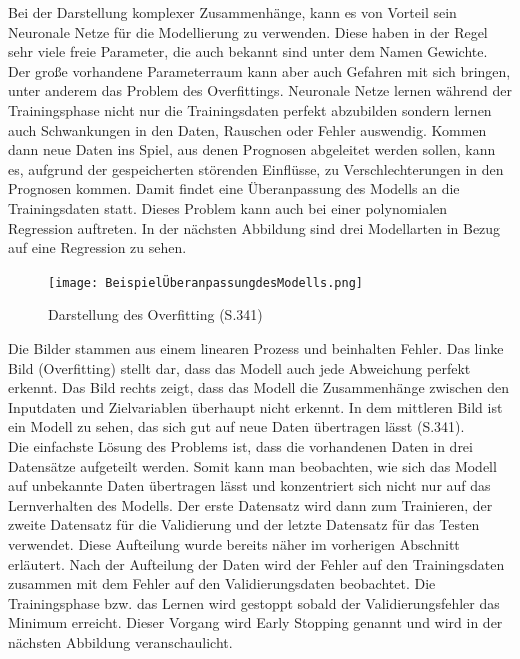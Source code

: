 \documentclass[12pt]{scrreprt}
\begin{document}
Bei der Darstellung komplexer Zusammenhänge, kann es von Vorteil sein Neuronale Netze für die Modellierung zu verwenden. Diese haben in der Regel sehr viele freie Parameter, die auch bekannt sind unter dem Namen Gewichte. Der große vorhandene Parameterraum kann aber auch Gefahren mit sich bringen, unter anderem das Problem des Overfittings. Neuronale Netze lernen während der Trainingsphase nicht nur die Trainingsdaten perfekt abzubilden sondern lernen auch Schwankungen in den Daten, Rauschen oder Fehler auswendig. Kommen dann neue Daten ins Spiel, aus denen Prognosen abgeleitet werden sollen, kann es, aufgrund der gespeicherten störenden Einflüsse, zu Verschlechterungen in den Prognosen kommen. Damit findet eine Überanpassung des Modells an die Trainingsdaten statt. Dieses Problem kann auch bei einer polynomialen Regression auftreten. In der nächsten Abbildung sind drei Modellarten in Bezug auf eine Regression zu sehen.\\

\begin{figure}[h!]
	\centering
	\texttt{[image: BeispielÜberanpassungdesModells.png]}
	\caption{Darstellung des Overfitting \cite{Vogl2021} (S.341)}
	\label{fig:fig22}
\end{figure}

Die Bilder stammen aus einem linearen Prozess und beinhalten Fehler. Das linke Bild (Overfitting) stellt dar, dass das Modell auch jede Abweichung perfekt erkennt. Das Bild rechts zeigt, dass das Modell die Zusammenhänge zwischen den Inputdaten und Zielvariablen überhaupt nicht erkennt. In dem mittleren Bild ist ein Modell zu sehen, das sich gut auf neue Daten übertragen lässt \cite{Vogl2021} (S.341).\\

Die einfachste Lösung des Problems ist, dass die vorhandenen Daten in drei Datensätze aufgeteilt werden. Somit kann man beobachten, wie sich das Modell auf unbekannte Daten übertragen lässt und konzentriert sich nicht nur auf das Lernverhalten des Modells. Der erste Datensatz wird dann zum Trainieren, der zweite Datensatz für die Validierung und der letzte Datensatz für das Testen verwendet. Diese Aufteilung wurde bereits näher im vorherigen Abschnitt erläutert. Nach der Aufteilung der Daten wird der Fehler auf den Trainingsdaten zusammen mit dem Fehler auf den Validierungsdaten beobachtet. Die Trainingsphase bzw. das Lernen wird gestoppt sobald der Validierungsfehler das Minimum erreicht. Dieser Vorgang wird Early Stopping genannt und wird in der nächsten Abbildung veranschaulicht.\\
\end{document}
